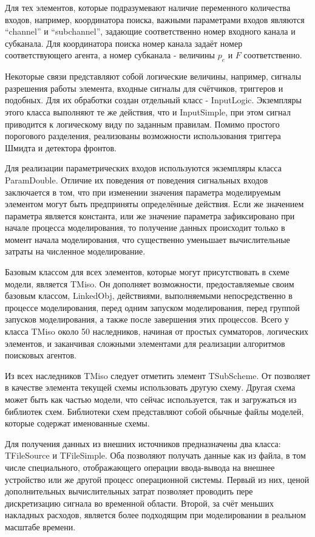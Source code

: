 Для тех элементов, которые подразумевают наличие переменного количества входов,
например, координатора поиска, важными параметрами входов являются
``channel'' и ``subchannel'', задающие соответственно
номер входного канала и субканала. Для координатора поиска
номер канала задаёт номер соответствующего агента,
а номер субканала - величины $p_e$ и $F$ соответственно.

Некоторые связи представляют собой логические величины,
например, сигналы разрешения работы элемента,
входные сигналы для счётчиков, триггеров и подобных.
Для их обработки создан отдельный класс - InputLogic.
Экземпляры этого класса выполняют те же действия,
что и InputSimple, при этом сигнал приводится
к логическому виду по заданным правилам.
Помимо простого порогового разделения,
реализованы возможности использования триггера Шмидта
и детектора фронтов.

Для реализации параметрических входов используются экземпляры класса ParamDouble.
Отличие их поведения от поведения сигнальных входов заключается в том,
что при изменении значения параметра моделируемым элементом
могут быть предприняты определённые
действия. Если же значением параметра является константа, или же
значение параметра зафиксировано при начале процесса моделирования,
то получение данных происходит только в момент начала моделирования,
что существенно уменьшает вычислительные затраты на численное моделирование.

Базовым классом для всех элементов, которые могут присутствовать
в схеме модели, является TMiso. Он дополняет
возможности, предоставляемые своим базовым классом, LinkedObj,
действиями, выполняемыми непосредственно в процессе
моделирования, перед одним запуском моделирования,
перед группой запусков моделирования, а также после
завершения этих процессов.
Всего у класса TMiso около 50 наследников,
начиная от простых сумматоров, логических элементов,
и заканчивая сложными элементами для реализации
алгоритмов поисковых агентов.

Из всех наследников TMiso следует отметить элемент TSubScheme.
От позволяет в качестве элемента текущей схемы использовать
другую схему. Другая схема может быть как частью модели,
что сейчас используется, так и загружаться из библиотек схем.
Библиотеки схем представляют собой обычные файлы моделей,
которые содержат именованные схемы.

Для получения данных из внешних источников предназначены
два класса: TFileSource и TFileSimple.
Оба позволяют получать данные как из файла, в том числе специального, отображающего
операции ввода-вывода на внешнее устройство или же другой процесс операционной системы.
Первый из них, ценой дополнительных вычислительных затрат позволяет
проводить пере дискретизацию сигнала во временной области.
Второй, за счёт меньших накладных расходов, является более
подходящим при моделировании в реальном масштабе времени.

